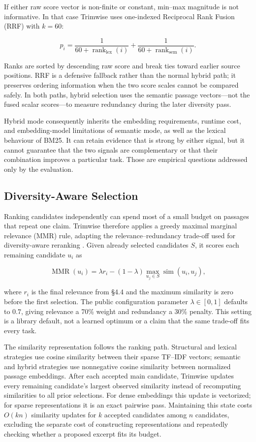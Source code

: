 \documentclass[
]{article}
\begin{document}
If either raw score vector is non-finite or constant, min--max magnitude
is not informative. In that case Trimwise uses one-indexed Reciprocal
Rank Fusion (RRF) \citep{cormack-clarke-buettcher-2009-rrf} with
\(k=60\):

\[
p_i = \frac{1}{60+\operatorname{rank}_{\mathrm{lex}}(i)}
    + \frac{1}{60+\operatorname{rank}_{\mathrm{sem}}(i)}.
\]

Ranks are sorted by descending raw score and break ties toward earlier
source positions. RRF is a defensive fallback rather than the normal
hybrid path; it preserves ordering information when the two score scales
cannot be compared safely. In both paths, hybrid selection uses the
semantic passage vectors---not the fused scalar scores---to measure
redundancy during the later diversity pass.

Hybrid mode consequently inherits the embedding requirements, runtime
cost, and embedding-model limitations of semantic mode, as well as the
lexical behaviour of BM25. It can retain evidence that is strong by
either signal, but it cannot guarantee that the two signals are
complementary or that their combination improves a particular task.
Those are empirical questions addressed only by the evaluation.

\subsection{Diversity-Aware Selection}\label{diversity-aware-selection}

Ranking candidates independently can spend most of a small budget on
passages that repeat one claim. Trimwise therefore applies a greedy
maximal marginal relevance (MMR) rule, adapting the
relevance--redundancy trade-off used for diversity-aware reranking
\citep{goldstein-carbonell-1998-mmr}. Given already selected candidates
\(S\), it scores each remaining candidate \(u_i\) as

\[
\operatorname{MMR}(u_i) = \lambda r_i
  - (1-\lambda)\max_{u_j \in S}\operatorname{sim}(u_i,u_j),
\]

where \(r_i\) is the final relevance from §4.4 and the maximum
similarity is zero before the first selection. The public configuration
parameter \(\lambda\in[0,1]\) defaults to \(0.7\), giving relevance a
70\% weight and redundancy a 30\% penalty. This setting is a library
default, not a learned optimum or a claim that the same trade-off fits
every task.

The similarity representation follows the ranking path. Structural and
lexical strategies use cosine similarity between their sparse TF--IDF
vectors; semantic and hybrid strategies use nonnegative cosine
similarity between normalized passage embeddings. After each accepted
main candidate, Trimwise updates every remaining candidate's largest
observed similarity instead of recomputing similarities to all prior
selections. For dense embeddings this update is vectorized; for sparse
representations it is an exact pairwise pass. Maintaining this state
costs \(O(kn)\) similarity updates for \(k\) accepted candidates among
\(n\) candidates, excluding the separate cost of constructing
representations and repeatedly checking whether a proposed excerpt fits
its budget.
\end{document}
